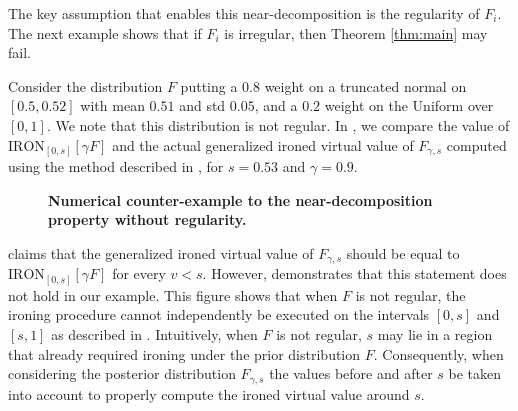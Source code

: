 The key assumption that enables this near-decomposition is the regularity of $F_i$. The next example shows that if $F_i$ is irregular, then Theorem \ref{thm:main} may fail.

\begin{example}
    Consider the distribution $F$ putting a $0.8$ weight on a truncated normal on $[0.5,0.52]$ with mean $0.51$ and std $0.05$, and a $0.2$ weight on the Uniform over $[0,1]$. We note that this distribution is not regular. In , we compare the value of $\mathrm{IRON}_{[0,s]}[\gamma F]$ and the actual generalized ironed virtual value of  $F_{\gamma,s}$  computed using the method described in , for $s = 0.53$ and $\gamma = 0.9$.
\begin{figure}[h!]
    \centering
    \caption{\textbf{Numerical counter-example to the near-decomposition property without regularity.}}
    \label{fig:counter_example}
\end{figure}

 claims that the generalized ironed virtual value of  $F_{\gamma,s}$ should be equal to $\mathrm{IRON}_{[0,s]}[\gamma F]$ for every $v < s$. However,  demonstrates that this statement does not hold in our example. This figure shows that when $F$ is not regular, the ironing procedure cannot independently be executed on the intervals $[0,s]$ and $[s,1]$ as described in . Intuitively, when $F$ is not regular, $s$ may lie in a region that already required ironing under the prior distribution $F$. Consequently, when considering the posterior distribution $F_{\gamma,s}$ the values before and after $s$  be taken into account to properly compute the ironed virtual value around $s$. 
\end{example}


